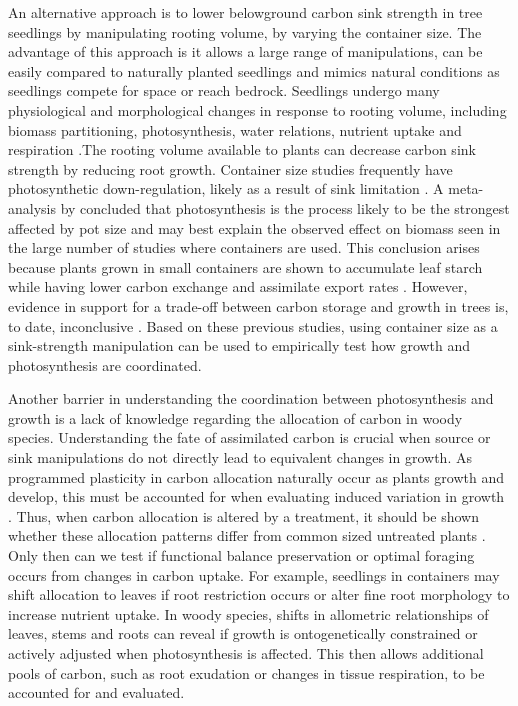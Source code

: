 \documentclass[a4paper]{article}\usepackage[]{graphicx}\usepackage[]{color}
\begin{document}
An alternative approach is to lower belowground carbon sink strength in tree seedlings by manipulating rooting volume, by varying the container size. The advantage of this approach is it allows a large range of manipulations, can be easily compared to naturally planted seedlings and mimics natural conditions as seedlings compete for space or reach bedrock. Seedlings undergo many physiological and morphological changes in response to rooting volume, including biomass partitioning, photosynthesis, water relations, nutrient uptake and respiration \citep[and references therein]{nesmith1998effect}.The rooting volume available to plants can decrease carbon sink strength by reducing root growth. Container size studies frequently have photosynthetic down-regulation, likely as a result of sink limitation \citep{arp1991effects, mcconnaughay1991physical, gunderson1994photosynthetic, sage1994acclimation, maina2002intra, ronchi2006growth}. A meta-analysis by \citet{poorter2012pot} concluded that photosynthesis is the process likely to be the strongest affected by pot size and may best explain the observed effect on biomass seen in the large number of studies where containers are used. This conclusion arises because plants grown in small containers are shown to accumulate leaf starch while having lower carbon exchange and assimilate export rates \citep{robbins1988effect}. However, evidence in support for a trade-off between carbon storage and growth in trees is, to date, inconclusive \citep{palacio2014does}. Based on these previous studies, using container size as a sink-strength manipulation can be used to empirically test how growth and photosynthesis are coordinated.

Another barrier in understanding the coordination between photosynthesis and growth is a lack of knowledge regarding the allocation of carbon in woody species.  Understanding the fate of assimilated carbon is crucial when source or sink manipulations do not directly lead to equivalent changes in growth. As programmed plasticity in carbon allocation naturally occur as plants growth and develop, this must be accounted for when evaluating induced variation in growth \citep{wright2002interpreting}. Thus, when carbon allocation is altered by a treatment, it should be shown whether these allocation patterns differ from common sized untreated plants \citep{reich2002root, poorter2012biomass}. Only then can we test if functional balance preservation or optimal foraging occurs from changes in carbon uptake. For example, seedlings in containers may shift allocation to leaves if root restriction occurs or alter fine root morphology to increase nutrient uptake. In woody species, shifts in allometric relationships of leaves, stems and roots can reveal if growth is ontogenetically constrained or actively adjusted when photosynthesis is affected. This then allows additional pools of carbon, such as root exudation or changes in tissue respiration, to be accounted for and evaluated.
\end{document}
